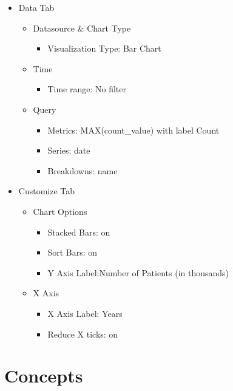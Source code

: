 \documentclass[
]{book}
\providecommand{\tightlist}{%
  \setlength{\itemsep}{0pt}\setlength{\parskip}{0pt}}
\begin{document}
\begin{itemize}
\item
  Data Tab

  \begin{itemize}
  \item
    Datasource \& Chart Type

    \begin{itemize}
    \tightlist
    \item
      Visualization Type: Bar Chart
    \end{itemize}
  \item
    Time

    \begin{itemize}
    \tightlist
    \item
      Time range: No filter
    \end{itemize}
  \item
    Query

    \begin{itemize}
    \item
      Metrics: MAX(count\_value) with label Count
    \item
      Series: date
    \item
      Breakdowns: name
    \end{itemize}
  \end{itemize}
\item
  Customize Tab

  \begin{itemize}
  \item
    Chart Options

    \begin{itemize}
    \item
      Stacked Bars: on
    \item
      Sort Bars: on
    \item
      Y Axis Label:Number of Patients (in thousands)
    \end{itemize}
  \item
    X Axis

    \begin{itemize}
    \item
      X Axis Label: Years
    \item
      Reduce X ticks: on
    \end{itemize}
  \end{itemize}
\end{itemize}

\hypertarget{concepts}{%
\chapter{Concepts}\label{concepts}}
\end{document}

